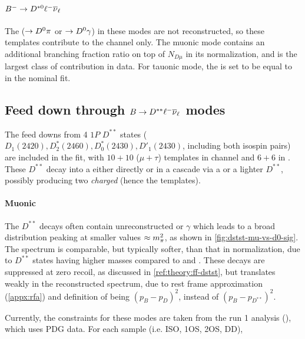 \paragraph{${{{B}^-}} \rightarrow D^{*0}{\ell^-}{{\overline{\nu}}_\ell}$}
The \Dstarz ($\rightarrow {\ensuremath{{D}^0}} \pi$ or $\rightarrow {\ensuremath{{D}^0}} \gamma$)
in these modes are not reconstructed,
so these templates contribute to the \Dz channel only.
The muonic mode contains an additional branching fraction ratio on top of
$N_{D\mu}$ in its normalization, and is the largest class of contribution
in \Dz data.
For tauonic mode, the \RDstz is set to be equal to \RDstp in the nominal fit.


\subsection{Feed down through $B \rightarrow D^{**}{\ell^-}{{\overline{\nu}}_\ell}$ modes}
\label{tmpl:dstst}

The feed downs from 4 $1P$ $D^{**}$ states
($D_1(2420), D_2^*(2460), D_0^*(2430), D'_1(2430)$, including both isospin
pairs) are included in the fit,
with $10+10$ ($\mu+\tau$) templates in \Dz channel
and $6+6$ in \Dstar.
These $D^{**}$ decay into a \Dz either directly or in a
cascade via a \Dstar or a lighter $D^{**}$,
possibly producing two \emph{charged} \pion
(hence the \Dz\pion\pion templates).

\paragraph{Muonic}
The $D^{**}$ decays often contain unreconstructed \piz or $\gamma$ which leads
to a broad \mmSq distribution peaking at smaller values $\approx m^2_{\pi}$,
as shown in \cref{fig:dstst-mu-vs-d0-sig}.
The \el spectrum is comparable, but typically softer, than that in normalization,
due to $D^{**}$ states having higher masses compared to \Dz and \Dstar.
These decays are suppressed at zero recoil, as discussed in
\cref{ref:theory:ff-dstst},
but translates weakly in the reconstructed \qSq spectrum, due to rest frame
approximation (\cref{appx:rfa}) and definition of \qSq being
$(p_B - p_D)^2$, instead of $(p_B - p_{D^{**}})^2$.

Currently, the constraints for these modes are
taken from the run 1 analysis (\cite{LHCb-ANA-2020-056}), which uses PDG data.
For each sample (i.e. ISO, 1OS, 2OS, DD),

